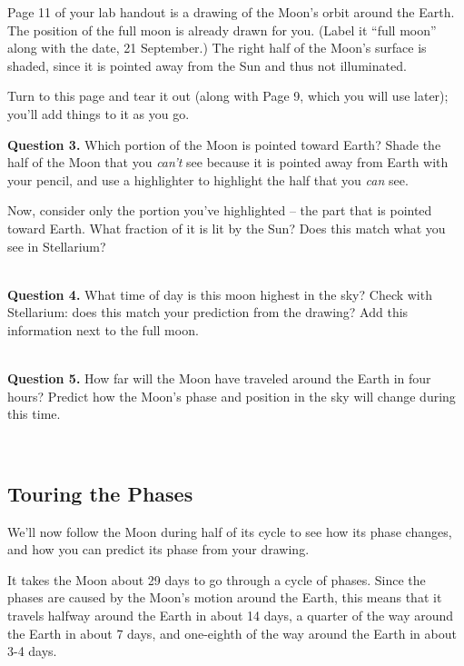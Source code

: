 \documentclass[11pt]{article}
\begin{document}
\newpage


Page 11 of your lab handout is a drawing of the Moon's orbit around the Earth. The position 
of the full moon is already drawn for you. (Label it ``full moon'' along with the date, 21 September.) The right half of the Moon's surface is shaded, since it is pointed away from the Sun and thus not illuminated.

Turn to this page and tear it out (along with Page 9, which you will use later); you'll add things to it as you go.\vspace{1cm}

\textbf{Question 3.} Which portion of the Moon is pointed toward Earth? Shade the half of the Moon that you {\it can't}
see because it is pointed away from Earth with your pencil, and use a highlighter to highlight the half that you {\it can} see.

Now, consider only the portion you've highlighted -- the part that is pointed toward Earth. What fraction of it is lit 
by the Sun? Does this match what you see in Stellarium?

\vspace*{1.5cm}

\hrulefill\\

\textbf{Question 4.} What time of day is this moon highest in the sky? Check with Stellarium: does this match your 
prediction from the drawing? Add this information next to the full moon.

\vspace*{1.5cm}

\hrulefill\\

\textbf{Question 5.} How far will the Moon have traveled around the Earth in four hours? Predict how the Moon's phase and position
in the sky will change during this time. 

\vspace*{1.5cm}

\hrulefill\\


\subsection{Touring the Phases}


We'll now follow the Moon during half of its cycle to see how its phase changes, and how you can predict its phase from your drawing.

It takes the Moon about 29 days to go through a cycle of phases. Since the phases are caused by the Moon's motion around the Earth,
this means that it travels halfway around the Earth in about 14 days, a quarter of the way around the Earth in about 7 days, and one-eighth of the way around the Earth in about 3-4 days.
\end{document}
